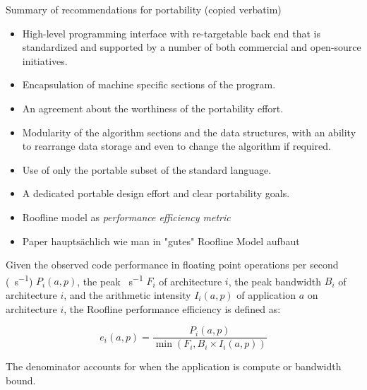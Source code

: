 Summary of recommendations for portability (copied verbatim)
\begin{itemize}
    \item High-level programming interface with re-targetable back end that is standardized and supported by a number of both commercial and open-source initiatives.
    \item Encapsulation of machine specific sections of the program.
    \item An agreement about the worthiness of the portability effort.
    \item Modularity of the algorithm sections and the data structures, with an ability to rearrange data storage and even to change the algorithm if required.
    \item Use of only the portable subset of the standard language.
    \item A dedicated portable design effort and clear portability goals.
\end{itemize}


\newpage
\cite{yang_empirical_2018}

\begin{itemize}
    \item Roofline model as \textit{performance efficiency metric}
    \item Paper hauptsächlich wie man in "gutes" Roofline Model aufbaut
\end{itemize}

\begin{definition}\label{def:roof_eff}
Given the observed code performance in floating point operations per second (\si{\flop\per\second}) $P_i(a, p)$, the peak \si{\flop\per\second} $F_i$ of architecture $i$, the peak bandwidth $B_i$ of architecture $i$, and the arithmetic intensity $I_i(a, p)$ of application $a$ on architecture $i$, the Roofline performance efficiency is defined as:

$$e_i(a, p) = \frac{P_i(a, p)}{\min(F_i, B_i \times I_i(a, p))}$$
\end{definition}
The denominator accounts for when the application is compute or bandwidth bound.


\newpage
\cite{yokota_beginners_2018}

